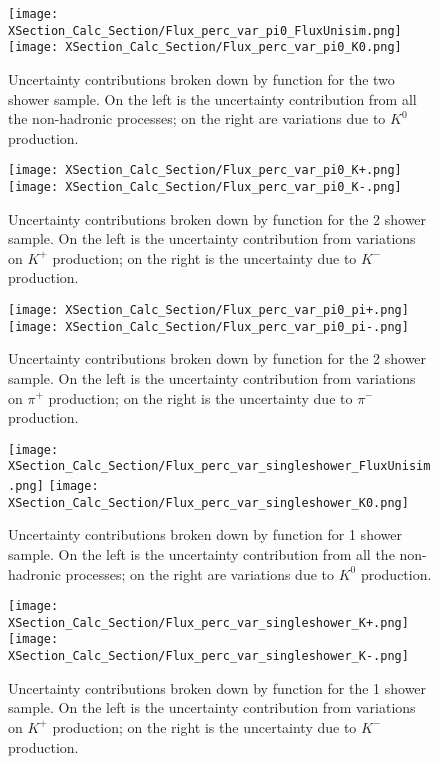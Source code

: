 \documentclass{article}
\begin{document}
\begin{figure}[h!]
\centering
\texttt{[image: XSection\_Calc\_Section/Flux\_perc\_var\_pi0\_FluxUnisim.png]}
\texttt{[image: XSection\_Calc\_Section/Flux\_perc\_var\_pi0\_K0.png]}
\caption{ Uncertainty contributions broken down by function for the two shower sample. On the left is the uncertainty contribution from all the non-hadronic processes; on the right are variations due to $K^0$ production. }
\label{fig:flux_2shower_unc_plots_0}
\end{figure}

\begin{figure}[h!]
\centering
\texttt{[image: XSection\_Calc\_Section/Flux\_perc\_var\_pi0\_K+.png]}
\texttt{[image: XSection\_Calc\_Section/Flux\_perc\_var\_pi0\_K-.png]}
\caption{ Uncertainty contributions broken down by function for the 2 shower sample. On the left is the uncertainty contribution from variations on $K^+$ production; on the right is the uncertainty due to $K^-$ production. }
\label{fig:flux_2shower_unc_plots_1}
\end{figure}

\begin{figure}[h!]
\centering
\texttt{[image: XSection\_Calc\_Section/Flux\_perc\_var\_pi0\_pi+.png]}
\texttt{[image: XSection\_Calc\_Section/Flux\_perc\_var\_pi0\_pi-.png]}
\caption{ Uncertainty contributions broken down by function for the 2 shower sample. On the left is the uncertainty contribution from variations on $\pi^+$ production; on the right is the uncertainty due to $\pi^-$ production. }
\label{fig:flux_2shower_unc_plots_2}
\end{figure}


\begin{figure}[h!]
\centering
\texttt{[image: XSection\_Calc\_Section/Flux\_perc\_var\_singleshower\_FluxUnisim.png]}
\texttt{[image: XSection\_Calc\_Section/Flux\_perc\_var\_singleshower\_K0.png]}
\caption{ Uncertainty contributions broken down by function for 1 shower sample. On the left is the uncertainty contribution from all the non-hadronic processes; on the right are variations due to $K^0$ production. }
\label{fig:flux_1shower_unc_plots_0}
\end{figure}

\begin{figure}[h!]
\centering
\texttt{[image: XSection\_Calc\_Section/Flux\_perc\_var\_singleshower\_K+.png]}
\texttt{[image: XSection\_Calc\_Section/Flux\_perc\_var\_singleshower\_K-.png]}
\caption{ Uncertainty contributions broken down by function for the 1 shower sample. On the left is the uncertainty contribution from variations on $K^+$ production; on the right is the uncertainty due to $K^-$ production. }
\label{fig:flux_1shower_unc_plots_1}
\end{figure}
\end{document}
